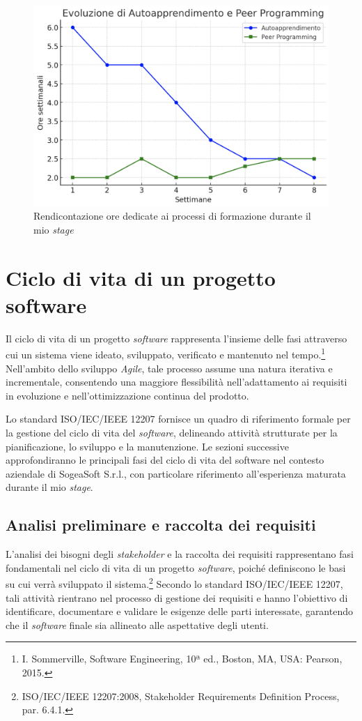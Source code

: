         \begin{figure} [H]
            \centering
            \includegraphics[width=0.8\linewidth]{BCS-Tessi/images/Rendicontazione_ore.png}
            \caption[Rendicontazione ore dedicate alla formazione]{Rendicontazione ore dedicate ai processi di formazione durante il mio \textit{stage}}
            \label{fig:Ore-formazione}
        \end{figure}
        

    \section{Ciclo di vita di un progetto software}
    Il ciclo di vita di un progetto \textit{software} rappresenta l’insieme delle fasi attraverso cui un sistema viene ideato, sviluppato, verificato e mantenuto nel tempo.\footnote{I. Sommerville, Software Engineering, 10ª ed., Boston, MA, USA: Pearson, 2015.} Nell’ambito dello sviluppo \textit{Agile}, tale processo assume una natura iterativa e incrementale, consentendo una maggiore flessibilità nell’adattamento ai requisiti in evoluzione e nell’ottimizzazione continua del prodotto.

    \vspace{0.2 em}
    \noindent Lo standard ISO/IEC/IEEE 12207 fornisce un quadro di riferimento formale per la gestione del ciclo di vita del \textit{software}, delineando attività strutturate per la pianificazione, lo sviluppo e la manutenzione. Le sezioni successive approfondiranno le principali fasi del ciclo di vita del software nel contesto aziendale di SogeaSoft S.r.l., con particolare riferimento all’esperienza maturata durante il mio \textit{stage}.
        \subsection{Analisi preliminare e raccolta dei requisiti}
        L’analisi dei bisogni degli \textit{stakeholder} e la raccolta dei requisiti rappresentano fasi fondamentali nel ciclo di vita di un progetto \textit{software}, poiché definiscono le basi su cui verrà sviluppato il sistema.\footnote{ISO/IEC/IEEE 12207:2008, Stakeholder Requirements Definition Process, par. 6.4.1.} Secondo lo standard ISO/IEC/IEEE 12207, tali attività rientrano nel processo di gestione dei requisiti e hanno l’obiettivo di identificare, documentare e validare le esigenze delle parti interessate, garantendo che il \textit{software} finale sia allineato alle aspettative degli utenti. 

